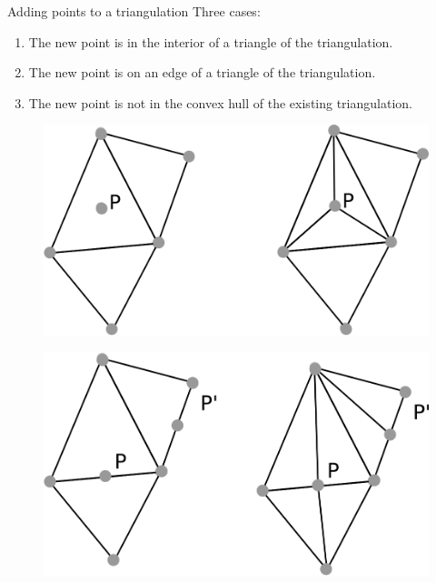 \documentclass[18pt]{beamer}
\begin{document}
\begin{frame}{Adding points to a triangulation}
Three cases:

\begin{enumerate}
\item<1-> The new point is in the interior of a triangle of the triangulation.
\item<2-> The new point is on an edge of a triangle of the triangulation.
\item<3-> The new point is not in the convex hull of the existing triangulation.
\end{enumerate}

\begin{overprint}
  \begin{figure}
\centering
\includegraphics[scale=0.8]{adding}
\end{figure}
  
  \begin{figure}
\centering
\includegraphics[scale=0.8]{adding2}
\end{figure}
  
  

\end{overprint}
\end{frame}
\end{document}
